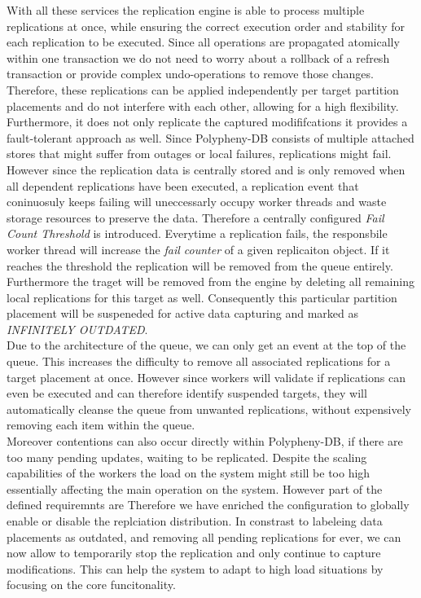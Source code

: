 With all these services the replication engine is able to process multiple replications at once, while ensuring the correct execution order and stability
for each replication to be executed. 
Since all operations are propagated atomically within one transaction we do not need to worry about a rollback of a refresh transaction or provide complex undo-operations 
to remove those changes. Therefore, these replications can be applied independently per target partition placements and do not interfere with each other, 
allowing for a high flexibility.
Furthermore, it does not only replicate the captured modififcations it provides a fault-tolerant approach as well. 
Since Polypheny-DB consists of multiple attached stores that might suffer from outages or local failures, replications might fail.
However since the replication data is centrally stored and is only removed when all dependent replications have been executed, 
a replication event that coninuosuly keeps failing will uneccessarly occupy worker threads and waste storage resources to preserve the data.
Therefore a centrally configured \emph{Fail Count Threshold} is introduced. Everytime a replication fails, the responsbile worker thread will increase the \textit{fail counter} 
of a given replicaiton object. If it reaches the threshold the replication will be removed from the queue entirely. 
Furthermore the traget will be removed from the engine by deleting all remaining local replications for this target as well.
Consequently this particular partition placement will be suspeneded for active data capturing and marked as \emph{INFINITELY OUTDATED}.\\

Due to the architecture of the queue, we can only get an event at the top of the queue. This increases the difficulty to remove all associated replications 
for a target placement at once. However since workers will validate if replications can even be executed and can therefore identify suspended targets, they will
automatically cleanse the queue from unwanted replications, without expensively removing each item within the queue.\\

Moreover contentions can also occur directly within Polypheny-DB, if there are too many pending updates, waiting to be replicated.
Despite the scaling capabilities of the workers the load on the system might still be too high essentially affecting the main operation on the system.
However part of the defined requiremnts are 
Therefore we have enriched the configuration to globally enable or disable the replciation distribution. In constrast to labeleing data placements as outdated, 
and removing all pending replications for ever, we can now allow to temporarily stop the replication and only continue to capture modifications. This can help the system
to adapt to high load situations by focusing on the core funcitonality.\\


